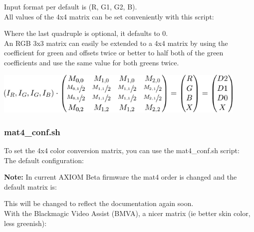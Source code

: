 Input format per default is (R, G1, G2, B).\\

All values of the 4x4 matrix can be set conveniently with this script:\\

    
Where the last quadruple is optional, it defaults to 0.\\

An RGB 3x3 matrix can easily be extended to a 4x4 matrix by using the coefficient for green and offsets twice or better to half both of the green coefficients and use the same value for both greens twice. \\    
    
\begin{center}
\includegraphics[height=2cm]{images/Eqn5}
\end{center}
    
    
    
    
    
   

\subsubsection{mat4\_conf.sh}

To set the 4x4 color conversion matrix, you can use the mat4\_conf.sh script:\\

The default configuration: 


\textbf{Note:} In current AXIOM Beta firmware the mat4 order is changed and the default matrix is: 


This will be changed to reflect the documentation again soon.\\

With the Blackmagic Video Assist (BMVA), a nicer matrix (ie better skin color, less greenish): 



